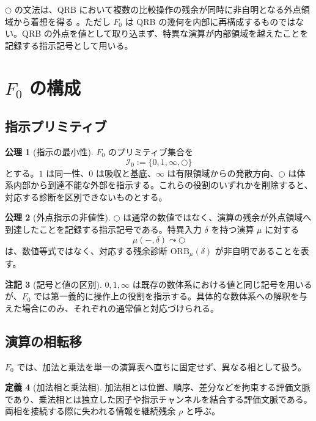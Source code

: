 \documentclass[a4paper,11pt]{ltjsarticle}
\theoremstyle{definition}
\newtheorem{definition}{定義}[section]
\newtheorem{axiom}[definition]{公理}
\newtheorem{remark}[definition]{注記}
\theoremstyle{plain}
\newcommand{\dfix}{\bigcirc}
\newcommand{\Fzero}{F_{0}}
\begin{document}
$\dfix$ の文法は、QRB において複数の比較操作の残余が同時に非自明となる外点領域から着想を得る \cite{ChibaQRB2026}。ただし $\Fzero$ は QRB の幾何を内部に再構成するものではない。QRB の外点を値として取り込まず、特異な演算が内部領域を越えたことを記録する指示記号として用いる。

\section{\texorpdfstring{$F_0$}{F0} の構成}

\subsection{指示プリミティブ}

\begin{axiom}[指示の最小性]
$\Fzero$ のプリミティブ集合を
\[
 \mathcal{I}_0:=\{0,1,\infty,\dfix\}
\]
とする。$1$ は同一性、$0$ は吸収と基底、$\infty$ は有限領域からの発散方向、$\dfix$ は体系内部から到達不能な外部を指示する。これらの役割のいずれかを削除すると、対応する診断を区別できないものとする。
\end{axiom}

\begin{axiom}[外点指示の非値性]
$\dfix$ は通常の数値ではなく、演算の残余が外点領域へ到達したことを記録する指示記号である。特異入力 $\delta$ を持つ演算 $\mu$ に対する
\[
 \mu(-,\delta)\leadsto\dfix
\]
は、数値等式ではなく、対応する残余診断 $\mathrm{ORB}_{\mu}(\delta)$ が非自明であることを表す。
\end{axiom}

\begin{remark}[記号と値の区別]
$0,1,\infty$ は既存の数体系における値と同じ記号を用いるが、$\Fzero$ では第一義的に操作上の役割を指示する。具体的な数体系への解釈を与えた場合にのみ、それぞれの通常値と対応づけられる。
\end{remark}

\subsection{演算の相転移}

$\Fzero$ では、加法と乗法を単一の演算表へ直ちに固定せず、異なる相として扱う。

\begin{definition}[加法相と乗法相]
加法相とは位置、順序、差分などを拘束する評価文脈であり、乗法相とは独立した因子や指示チャンネルを結合する評価文脈である。両相を接続する際に失われる情報を継続残余 $\rho$ と呼ぶ。
\end{definition}
\end{document}
